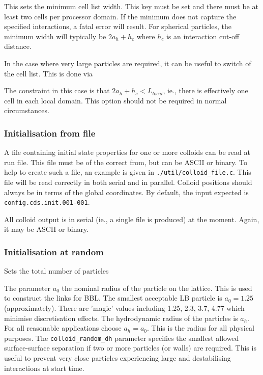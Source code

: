 
This sets the minimum cell list width. This key must be set and there
must be at least two cells per processor domain. If the minimum does
not capture the specified interactions, a fatal error will result.
For spherical particles, the minimum width will typically be
$2a_h + h_c$ where $h_c$ is an interaction cut-off distance.


In the case where very large particles are required, it can be useful
to switch of the cell list. This is done via


The constraint in this case is that $2a_h + h_c < L_{local}$, ie.,
there is effectively one cell in each local domain. This option
should not be required in normal circumstances.


\subsubsection{Initialisation from file}

A file containing initial state properties for one or more colloids
can be read at run file. This file must be of the correct from, but
can be ASCII or binary. To help to create such a file, an example
is given in \texttt{./util/colloid\_file.c}. This file will be
read correctly in both serial and in parallel. Colloid positions
should always be in terms of the global coordinates. By default,
the input expected is \texttt{config.cds.init.001-001}.

All colloid output is in serial (ie., a single file is produced)
at the moment. Again, it may be ASCII or binary.

\subsubsection{Initialisation at random}

 Sets the total number of particles




The parameter $a_0$ the nominal radius of the particle on the lattice.
This is used to construct the links for BBL. The smallest acceptable LB
particle is $a_0 = 1.25$ (approximately). There are 'magic' values
including 1.25, 2.3, 3.7, 4.77 which minimise discretisation effects.
The hydrodynamic radius of the particles is $a_h$. For all
reasonable applications choose $a_h = a_0$. This is the radius for
all physical purposes. The \texttt{colloid\_random\_dh} parameter
specifies the smallest allowed surface-surface separation if two or
more particles (or walls) are required. This is useful to prevent
very close particles experiencing large and destabilising interactions
at start time.


